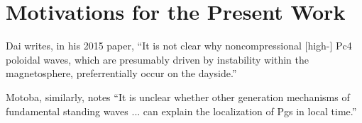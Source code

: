 






\section{Motivations for the Present Work}

Dai writes, in his 2015 paper\cite{dai_2015}, ``It is not clear why noncompressional [high-\azm] Pc4 poloidal waves, which are presumably driven by instability within the magnetosphere, preferrentially occur on the dayside.'' 

Motoba\cite{motoba_2015}, similarly, notes ``It is unclear whether other generation mechanisms of fundamental standing waves ... can explain the localization of Pgs in local time.''

